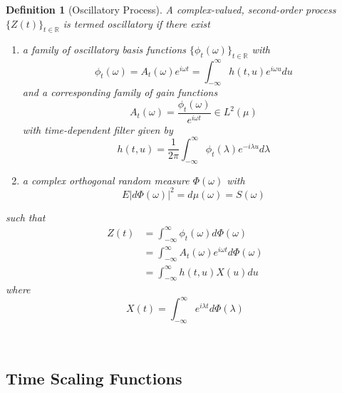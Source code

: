 \documentclass{article}
\newcommand{\tmem}[1]{{\em #1\/}}
\newtheorem{definition}{Definition}
\begin{document}
\begin{definition}
  [Oscillatory Process]\label{def:oscillatory} A complex-valued, second-order
  process $\{Z (t)\}_{t \in \mathbb{R}}$ is termed {\tmem{oscillatory}} if
  there exist
  \begin{enumerate}
    \item a family of oscillatory basis functions $\{\phi_t (\omega)\}_{t \in
    \mathbb{R}}$ with
    \begin{equation}
      \phi_t (\omega) = A_t (\omega) e^{i \omega t} = \int_{- \infty}^{\infty}
      h (t, u) e^{i \omega u} du
    \end{equation}
    and a corresponding family of gain functions
    \begin{equation}
      A_t (\omega) = \frac{\phi_t (\omega)}{e^{i \omega t}} \in L^2 (\mu)
      \label{envelope}
    \end{equation}
    with time-dependent filter given by
    \begin{equation}
      h (t, u) = \frac{1}{2 \pi}  \int_{- \infty}^{\infty} \phi_t (\lambda)
      e^{- i \lambda u} d \lambda
    \end{equation}
    \item a complex orthogonal random measure $\Phi (\omega)$ with
    \begin{equation}
      E |d \Phi (\omega) |^2 = d \mu (\omega) = S (\omega)
    \end{equation}
  \end{enumerate}
  such that
  \begin{equation}
    \begin{array}{ll}
      Z (t) & = \int_{- \infty}^{\infty} \phi_t (\omega) d \Phi (\omega)\\
      & = \int_{- \infty}^{\infty} A_t (\omega) e^{i \omega t} d \Phi
      (\omega)\\
      & = \int_{- \infty}^{\infty} h (t, u) X (u) du
    \end{array} \label{eq:oscillatory_rep}
  \end{equation}
  where
  \begin{equation}
    X (t) = \int_{- \infty}^{\infty} e^{i \lambda t} d \Phi (\lambda)
  \end{equation}
\end{definition}

\

\subsection{Time Scaling Functions}
\end{document}
